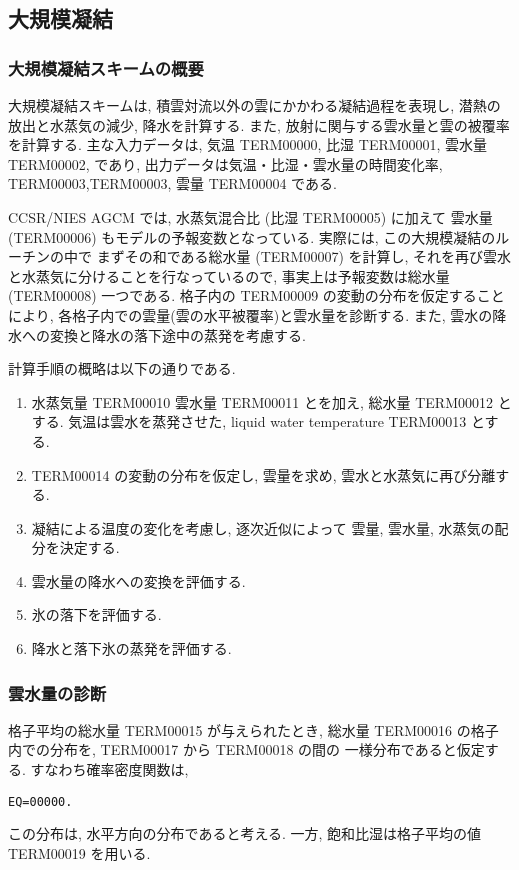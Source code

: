 ﻿
\subsection{大規模凝結}

\subsubsection{大規模凝結スキームの概要}

大規模凝結スキームは,
積雲対流以外の雲にかかわる凝結過程を表現し,
潜熱の放出と水蒸気の減少, 降水を計算する.
また, 放射に関与する雲水量と雲の被覆率を計算する.
主な入力データは, 気温 TERM00000, 比湿 TERM00001, 雲水量 TERM00002, であり,
出力データは気温・比湿・雲水量の時間変化率,
TERM00003,TERM00003,
雲量 TERM00004 である.

CCSR/NIES AGCM では, 水蒸気混合比 (比湿 TERM00005) に加えて
雲水量 (TERM00006) もモデルの予報変数となっている.
実際には, この大規模凝結のルーチンの中で
まずその和である総水量 (TERM00007) を計算し, 
それを再び雲水と水蒸気に分けることを行なっているので,
事実上は予報変数は総水量 (TERM00008) 一つである.
格子内の TERM00009 の変動の分布を仮定することにより,
各格子内での雲量(雲の水平被覆率)と雲水量を診断する.
また, 雲水の降水への変換と降水の落下途中の蒸発を考慮する.

計算手順の概略は以下の通りである.
%
\begin{enumerate}
\item 水蒸気量 TERM00010 雲水量 TERM00011 とを加え,
      総水量 TERM00012 とする.
      気温は雲水を蒸発させた, 
      liquid water temperature  TERM00013 とする.
\item TERM00014 の変動の分布を仮定し,
      雲量を求め, 雲水と水蒸気に再び分離する.
\item 凝結による温度の変化を考慮し,
      逐次近似によって
      雲量, 雲水量, 水蒸気の配分を決定する.
\item 雲水量の降水への変換を評価する.
\item 氷の落下を評価する.
\item 降水と落下氷の蒸発を評価する.
\end{enumerate}

\subsubsection{雲水量の診断}

格子平均の総水量 TERM00015 が与えられたとき,
総水量 TERM00016 の格子内での分布を,
TERM00017 から TERM00018 の間の
一様分布であると仮定する. すなわち確率密度関数は,
\begin{verbatim}
EQ=00000.
\end{verbatim}
この分布は, 水平方向の分布であると考える.
一方, 飽和比湿は格子平均の値 TERM00019 を用いる.

